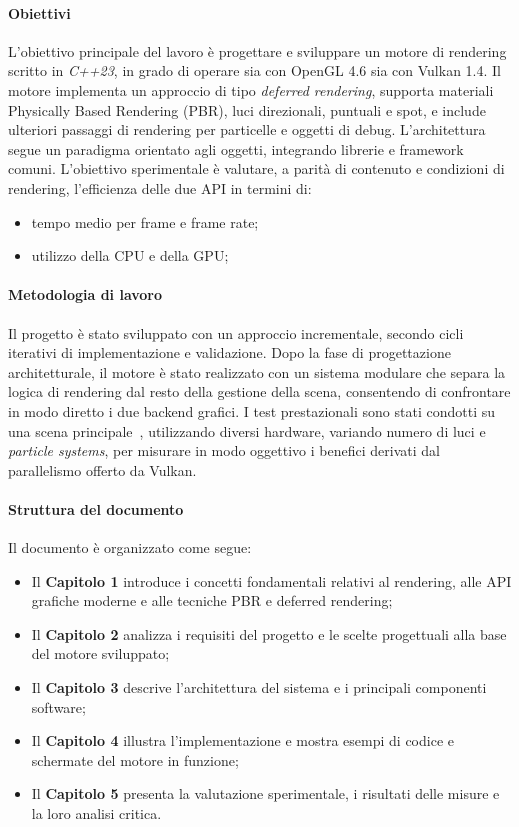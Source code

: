 \documentclass[12pt,a4paper,openright,twoside]{book}
\begin{document}
\paragraph{Obiettivi}
L’obiettivo principale del lavoro è progettare e sviluppare un motore di rendering scritto in \emph{C++23},
in grado di operare sia con OpenGL 4.6 sia con Vulkan 1.4.
Il motore implementa un approccio di tipo \emph{deferred rendering}, supporta materiali Physically Based Rendering (PBR),
luci direzionali, puntuali e spot, e include ulteriori passaggi di rendering per particelle e oggetti di debug.
L’architettura segue un paradigma orientato agli oggetti, integrando librerie e framework comuni.
L’obiettivo sperimentale è valutare, a parità di contenuto e condizioni di rendering, l’efficienza delle due API
in termini di:
\begin{itemize}
    \item tempo medio per frame e frame rate;
    \item utilizzo della CPU e della GPU;
\end{itemize}

\paragraph{Metodologia di lavoro}
Il progetto è stato sviluppato con un approccio incrementale, secondo cicli iterativi di implementazione e validazione.
Dopo la fase di progettazione architetturale, il motore è stato realizzato con un sistema modulare che separa la logica
di rendering dal resto della gestione della scena, consentendo di confrontare in modo diretto i due backend grafici.
I test prestazionali sono stati condotti su una scena principale~\cite{sponza_original,sponza_intel2022}, utilizzando
diversi hardware, variando numero di luci e \emph{particle systems}, per misurare in modo oggettivo i benefici derivati
dal parallelismo offerto da Vulkan.

\paragraph{Struttura del documento}
Il documento è organizzato come segue:
\begin{itemize}
   \item Il \textbf{Capitolo 1} introduce i concetti fondamentali relativi al rendering, alle API grafiche moderne e alle tecniche PBR e deferred rendering;
   \item Il \textbf{Capitolo 2} analizza i requisiti del progetto e le scelte progettuali alla base del motore sviluppato;
   \item Il \textbf{Capitolo 3} descrive l’architettura del sistema e i principali componenti software;
   \item Il \textbf{Capitolo 4} illustra l’implementazione e mostra esempi di codice e schermate del motore in funzione;
   \item Il \textbf{Capitolo 5} presenta la valutazione sperimentale, i risultati delle misure e la loro analisi critica.
\end{itemize}
\end{document}
